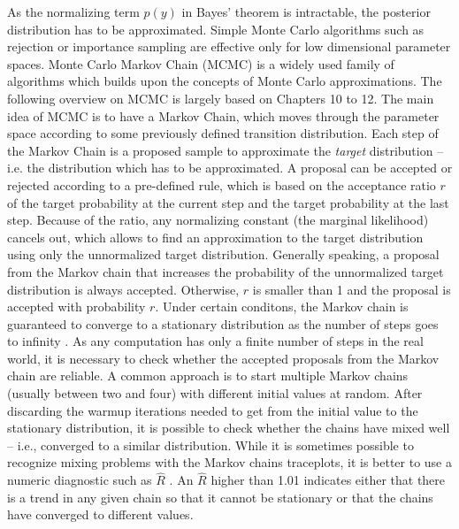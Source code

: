 As the normalizing term $p(y)$ in Bayes' theorem is intractable, the posterior distribution has to be approximated.
Simple Monte Carlo algorithms such as rejection or importance sampling are effective only for low dimensional parameter spaces.
Monte Carlo Markov Chain (MCMC) is a widely used family of algorithms which builds upon the concepts of Monte Carlo approximations.
The following overview on MCMC is largely based on \cite{gelman_bayesian_2014} Chapters 10 to 12.
The main idea of MCMC is to have a Markov Chain, which moves through the parameter space according to some previously defined transition distribution.
Each step of the Markov Chain is a proposed sample to approximate the \textit{target} distribution – i.e. the distribution which has to be approximated.
A proposal can be accepted or rejected according to a pre-defined rule, which is based on the acceptance ratio $r$ of the target probability at the current step and the target probability at the last step.
Because of the ratio, any normalizing constant (the marginal likelihood) cancels out, which allows to find an approximation to the target distribution using only the unnormalized target distribution.
Generally speaking, a proposal from the Markov chain that increases the probability of the unnormalized target distribution is always accepted.
Otherwise, $r$ is smaller than 1 and the proposal is accepted with probability $r$.
Under certain conditons, the Markov chain is guaranteed to converge to a stationary distribution as the number of steps goes to infinity \citep[Chapter 11]{gelman_bayesian_2014}.
As any computation has only a finite number of steps in the real world, it is necessary to check whether the accepted proposals from the Markov chain are reliable.
A common approach is to start multiple Markov chains (usually between two and four) with different initial values at random.
After discarding the warmup iterations needed to get from the initial value to the stationary distribution, it is possible to check whether the chains have mixed well – i.e., converged to a similar distribution.
While it is sometimes possible to recognize mixing problems with the Markov chains traceplots, it is better to use a numeric diagnostic such as $\hat R$ \citep{vehtari_rank-normalization_2021}.
An $\hat R$ higher than 1.01 indicates either that there is a trend in any given chain so that it cannot be stationary or that the chains have converged to different values.

